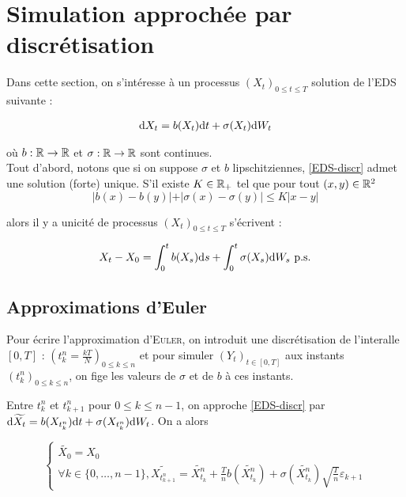 \section{Simulation approchée par discrétisation}
Dans cette section, on s'intéresse à un processus $(X_t)_{0 \leq t \leq T}$ solution de l'EDS suivante :

\begin{equation}
  \label{EDS-discr}
\begin{split}
\mathrm{d} X_t = b(X_t) \mathrm{d} t + \sigma(X_t) \mathrm{d} W_t 
\end{split}
\end{equation}

où $b : \mathbb{R} \to \mathbb{R}$ et $\sigma : \mathbb{R} \to \mathbb{R}$ sont continues. \\

Tout d'abord, notons que si on suppose $\sigma$ et $b$ lipschitziennes, \eqref{EDS-discr} admet une solution (forte) unique. S'il existe $K \in \mathbb{R}_+$ tel que pour tout $(x,y) \in \mathbb{R}^2$
\[ \vert b(x) - b(y) \vert + \vert \sigma(x) - \sigma(y) \vert \leq K \vert x - y \vert \]

alors il y a unicité de processus $(X_t)_{0 \leq t \leq T}$ s'écrivent :

\[ X_t - X_0 = \int_{0}^{t} b(X_s) \mathrm{d} s + \int_{0}^{t} \sigma(X_s) \mathrm{d} W_s \text{ p.s.} \]

\subsection{Approximations d'Euler}

Pour écrire l'approximation d'\textsc{Euler}, on introduit une discrétisation de l'interalle $[0,T]$ : $\left( t_k^n = \frac{kT}{N} \right)_{0 \leq k \leq n}$ et pour simuler $(Y_t)_{t \in [0,T]}$ aux instants $(t_k^n)_{0 \leq k \leq n}$, on \og fige \fg{} les valeurs de $\sigma$ et de $b$ à ces instants.

Entre $t_k^n$ et $t_{k+1}^n$ pour $0 \leq k \leq n-1$, on approche \eqref{EDS-discr} par $\mathrm{d} \widetilde{X_t} = b(X_{t_k^n}) \mathrm{d} t + \sigma(X_{t_k^n}) \mathrm{d} W_t$. On a alors 

  \[
    \begin{cases}
      \widetilde{X_0} = X_0 \\
      \forall k \in \{0, \ldots, n-1\}, \widetilde{X_{t_{k+1}^n}} = \widetilde{X_{t_k}^n} + \frac{T}{n} b(\widetilde{X_{t_k}^n}) + \sigma(\widetilde{X_{t_k}^n})\sqrt{ \frac{T}{n}} \varepsilon_{k+1}
    \end{cases}
  \]

